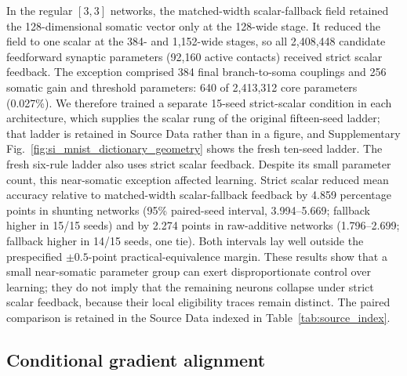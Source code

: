 In the regular $[3,3]$ networks, the matched-width scalar-fallback field retained the
128-dimensional somatic vector only at the 128-wide stage. It reduced the
field to one scalar at the 384- and 1,152-wide stages, so all 2,408,448
candidate feedforward synaptic parameters (92,160 active contacts) received
strict scalar feedback. The exception comprised 384 final branch-to-soma
couplings and 256 somatic gain and threshold parameters: 640 of 2,413,312 core
parameters (0.027\%). We therefore trained a separate 15-seed strict-scalar
condition in each architecture, which supplies the scalar rung of the original fifteen-seed ladder; that ladder is retained in Source Data rather than in a figure, and Supplementary Fig.~\ref{fig:si_mnist_dictionary_geometry} shows the fresh ten-seed ladder. The fresh six-rule ladder also uses strict scalar feedback.
Despite its small parameter count, this near-somatic exception affected
learning. Strict scalar reduced mean
accuracy relative to matched-width scalar-fallback feedback by 4.859 percentage points in shunting
networks (95\% paired-seed interval, 3.994--5.669; fallback higher in 15/15
seeds) and by 2.274 points in raw-additive networks (1.796--2.699; fallback higher
in 14/15 seeds, one tie). Both intervals lay well outside the prespecified
$\pm0.5$-point practical-equivalence margin. These results show that a small
near-somatic parameter group can exert disproportionate control over learning;
they do not imply that the remaining neurons collapse under strict scalar
feedback, because their local eligibility traces remain distinct.
The paired comparison is retained in the Source Data indexed in Table~\ref{tab:source_index}.

\subsection{Conditional gradient alignment}

